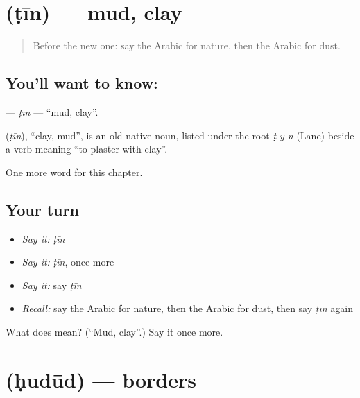 \section[\texorpdfstring{\ar{طين} (ṭīn)}{طين (ṭīn)}]{ (ṭīn) — mud, clay}

\label{lesson:AR-C205-tin}



\begin{quote}
Before the new one: say the Arabic for nature, then the Arabic for dust.
\end{quote}

\subsection*{You'll want to know: }
\textbf{} — \emph{ṭīn} — \textquotedblleft{}mud, clay\textquotedblright{}.

\begin{cousinweb}
\textbf{} (\emph{ṭīn}), \textquotedblleft{}clay, mud\textquotedblright{}, is an old native noun, listed under the root \emph{ṭ-y-n} (Lane) beside a verb meaning \textquotedblleft{}to plaster with clay\textquotedblright{}.
\end{cousinweb}

\begin{grammarlens}[title={What you've built}]
One more word for this chapter.
\end{grammarlens}

\subsection*{Your turn}
\begin{itemize}
\raggedright
  \item \emph{Say it:} \emph{ṭīn}
  \item \emph{Say it:} \emph{ṭīn}, once more
  \item \emph{Say it:} say \emph{ṭīn}
  \item \emph{Recall:} say the Arabic for nature, then the Arabic for dust, then say \emph{ṭīn} again
\end{itemize}

\begin{tcolorbox}[breakable,colback=teal!4,colframe=teal!35!black,title={Before you move on}]
What does  mean? (\textquotedblleft{}Mud, clay\textquotedblright{}.) Say it once more.
\end{tcolorbox}
\section[\texorpdfstring{\ar{حدود} (ḥudūd)}{حدود (ḥudūd)}]{ (ḥudūd) — borders}


